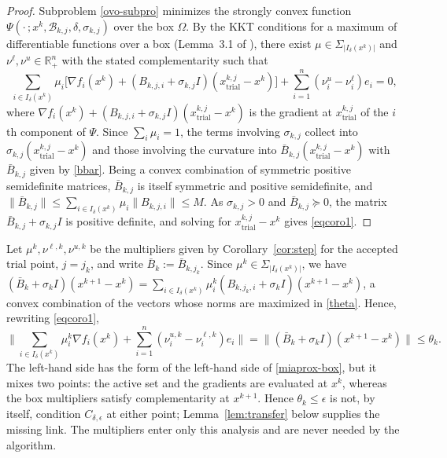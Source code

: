 \documentclass[11pt]{article}
\newcommand{\xkjtrial}{x^{k,j}_{\mathrm{trial}}}
\newcounter{alg}[section]
\begin{document}
\begin{proof}
Subproblem \eqref{ovo-subpro} minimizes the strongly convex function
$\Psi(\cdot\,; x^k, \mathcal{B}_{k,j}, \delta, \sigma_{k,j})$ over the box
$\Omega$. By
the KKT conditions for a maximum of differentiable functions over a box
(Lemma~3.1 of \cite{alvarezovo}), there exist $\mu \in \Sigma_{|I_\delta(x^k)|}$ and
$\nu^\ell, \nu^u \in \mathbb{R}^n_+$ with the stated complementarity such that
\[
\sum_{i \in I_\delta(x^k)} \mu_i
\big[ \nabla f_i(x^k) + (B_{k,j,i} + \sigma_{k,j} I)(\xkjtrial - x^k) \big]
+ \sum_{i=1}^n (\nu^u_i - \nu^\ell_i) e_i = 0,
\]
where $\nabla f_i(x^k) + (B_{k,j,i} + \sigma_{k,j} I)(\xkjtrial - x^k)$ is the
gradient at $\xkjtrial$ of the $i$th component of $\Psi$. Since
$\sum_i \mu_i = 1$, the terms involving $\sigma_{k,j}$ collect into
$\sigma_{k,j}(\xkjtrial - x^k)$ and those involving the curvature into
$\bar{B}_{k,j}(\xkjtrial - x^k)$ with $\bar{B}_{k,j}$ given by \eqref{bbar}.
Being a convex combination of symmetric positive semidefinite matrices,
$\bar{B}_{k,j}$ is itself symmetric and positive semidefinite, and
$\|\bar{B}_{k,j}\| \leq \sum_{i \in I_\delta(x^k)} \mu_i \|B_{k,j,i}\| \leq M$.
As $\sigma_{k,j} > 0$ and $\bar{B}_{k,j} \succeq 0$, the matrix
$\bar{B}_{k,j} + \sigma_{k,j} I$ is positive definite, and solving for
$\xkjtrial - x^k$ gives \eqref{eqcoro1}.
\end{proof}

Let $\mu^k, \nu^{\ell,k}, \nu^{u,k}$ be the multipliers given by
Corollary~\ref{cor:step} for the accepted trial point, $j = j_k$, and write
$\bar{B}_k := \bar{B}_{k,j_k}$. Since $\mu^k \in \Sigma_{|I_\delta(x^k)|}$, we
have $(\bar{B}_k + \sigma_k I)(x^{k+1} - x^k) = \sum_{i \in I_\delta(x^k)}
\mu^k_i (B_{k,j_k,i} + \sigma_k I)(x^{k+1} - x^k)$, a convex combination of the
vectors whose norms are maximized in \eqref{theta}. Hence, rewriting
\eqref{eqcoro1},
\begin{equation} \label{theta-kkt}
\Big\| \sum_{i \in I_\delta(x^k)} \mu^k_i \nabla f_i(x^k)
+ \sum_{i=1}^n (\nu^{u,k}_i - \nu^{\ell,k}_i) e_i \Big\|
= \big\| (\bar{B}_k + \sigma_k I)(x^{k+1} - x^k) \big\|
\leq \theta_k .
\end{equation}
The left-hand side has the form of the left-hand side of \eqref{miaprox-box},
but it mixes two points: the active set and the gradients are evaluated at
$x^k$, whereas the box multipliers satisfy complementarity at $x^{k+1}$. Hence
$\theta_k \leq \epsilon$ is not, by itself, condition $C_{\delta,\epsilon}$ at
either point; Lemma~\ref{lem:transfer} below supplies the missing link. The
multipliers enter only this analysis and are never needed by the algorithm.
\end{document}

